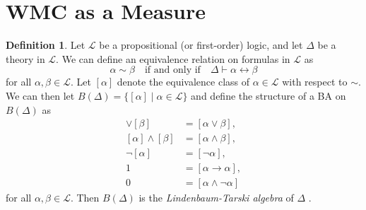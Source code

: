 \documentclass{article}
\theoremstyle{definition}
\newtheorem{definition}[theorem]{Definition}
\theoremstyle{remark}
\begin{document}
\section{WMC as a Measure}

\begin{definition} \label{def:algebra_from_logic}
  Let $\mathcal{L}$ be a propositional (or first-order) logic, and let
  $\Delta$ be a theory in $\mathcal{L}$. We can define an equivalence
  relation on formulas in $\mathcal{L}$ as
  \[
    \alpha \sim \beta \quad \text{if and only if} \quad \Delta \vdash \alpha
    \leftrightarrow \beta
  \]
  for all $\alpha, \beta \in \mathcal{L}$. Let $[\alpha]$ denote the equivalence
  class of $\alpha \in \mathcal{L}$ with respect to $\sim$. We can then let
  $B(\Delta) = \{ [\alpha] \mid \alpha \in \mathcal{L} \}$ and define the
  structure of a BA on $B(\Delta)$ as
  \begin{align*}
    [\alpha] \lor [\beta] &= [\alpha \lor \beta], \\
    [\alpha] \land [\beta] &= [\alpha \land \beta], \\
    \neg[\alpha] &= [\neg\alpha], \\
    1 &= [\alpha \to \alpha], \\
    0 &= [\alpha \land \neg\alpha]
  \end{align*}
  for all $\alpha, \beta \in \mathcal{L}$. Then $B(\Delta)$ is the
  \emph{Lindenbaum-Tarski algebra} of $\Delta$
  \cite{koppelberg1989handbook,tarski1983logic}.
\end{definition}
\end{document}
